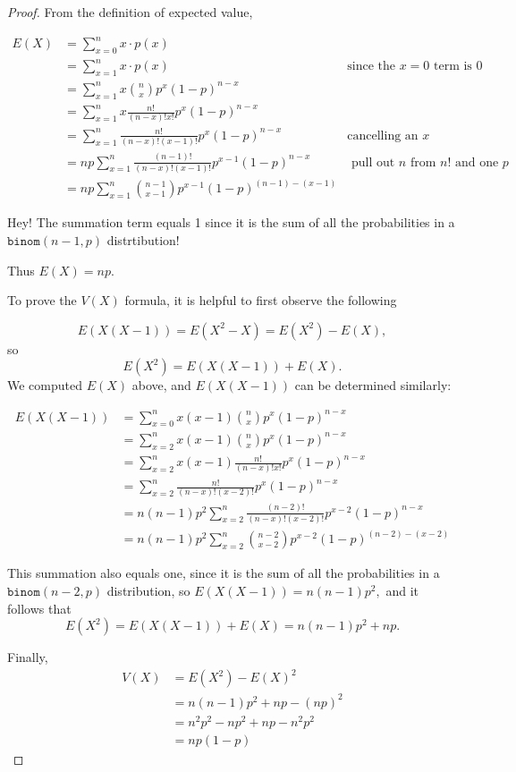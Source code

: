 \documentclass[
]{book}
\theoremstyle{definition}
\theoremstyle{definition}
\theoremstyle{definition}
\theoremstyle{definition}
\theoremstyle{remark}
\begin{document}
\begin{proof}
From the definition of expected value,

\begin{align*}
E(X) &= \sum_{x=0}^n x \cdot p(x) \\
     &= \sum_{x=1}^n x \cdot p(x) & \text{since the } x = 0 \text{ term is  } 0 \\
     &= \sum_{x=1}^n x \binom{n}{x} p^x (1-p)^{n-x} \\
     &= \sum_{x=1}^n x \frac{n!}{(n-x)!x!} p^x (1-p)^{n-x} \\
     &= \sum_{x=1}^n \frac{n!}{(n-x)!(x-1)!} p^x (1-p)^{n-x} &\text{cancelling an } x\\
     &= np \sum_{x=1}^n \frac{(n-1)!}{(n-x)!(x-1)!}p^{x-1}(1-p)^{n-x} &\text{ pull out }n\text{ from }n!\text{ and one }p\\
     &= np \sum_{x=1}^n \binom{n-1}{x-1}p^{x-1}(1-p)^{(n-1)-(x-1)}
\end{align*}

Hey! The summation term equals 1 since it is the sum of all the probabilities in a \(\texttt{binom}(n-1,p)\) distrtibution!

Thus \(E(X) = np\).

To prove the \(V(X)\) formula, it is helpful to first observe the following

\[E(X(X-1)) = E(X^2-X) = E(X^2)-E(X),\] so
\[E(X^2) = E(X(X-1))+E(X).\]
We computed \(E(X)\) above, and \(E(X(X-1))\) can be determined similarly:

\begin{align*}
E(X(X-1)) &= \sum_{x=0}^n x(x-1)\binom{n}{x}p^x(1-p)^{n-x} \\
          &= \sum_{x=2}^n x(x-1)\binom{n}{x}p^x(1-p)^{n-x} \\
          &= \sum_{x=2}^n x(x-1)\frac{n!}{(n-x)!x!}p^x(1-p)^{n-x} \\
          &= \sum_{x=2}^n \frac{n!}{(n-x)!(x-2)!}p^x(1-p)^{n-x} \\
          &= n(n-1)p^2 \sum_{x=2}^n \frac{(n-2)!}{(n-x)!(x-2)!}p^{x-2}(1-p)^{n-x} \\
          &= n(n-1)p^2 \sum_{x=2}^n\binom{n-2}{x-2}p^{x-2}(1-p)^{(n-2)-(x-2)}
\end{align*}

This summation also equals one, since it is the sum of all the probabilities in a \(\texttt{binom}(n-2,p)\) distribution, so \(E(X(X-1)) = n(n-1)p^2,\) and it follows that
\[E(X^2) = E(X(X-1))+E(X) = n(n-1)p^2 + np.\]

Finally,
\begin{align*} 
V(X) &= E(X^2) - E(X)^2 \\
     &= n(n-1)p^2 + np - (np)^2 \\
     &= n^2p^2 - np^2 + np - n^2p^2 \\
     &= np(1-p)
\end{align*}
\end{proof}
\end{document}
